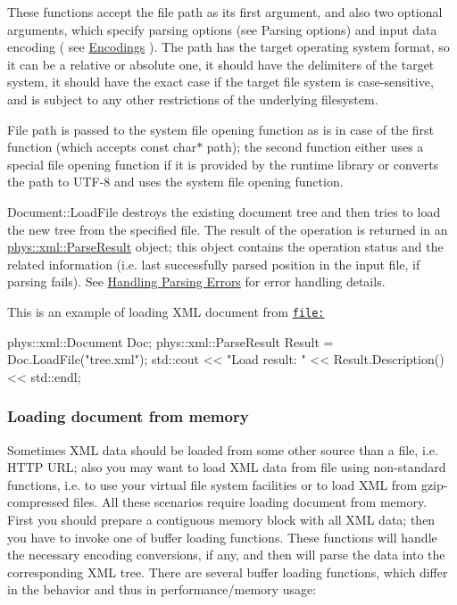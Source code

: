  These functions accept the file path as its first argument, and also two optional arguments, which specify parsing options (see Parsing options) and input data encoding ( see \hyperlink{XMLManual_XMLLoadingEncodings}{Encodings} ). The path has the target operating system format, so it can be a relative or absolute one, it should have the delimiters of the target system, it should have the exact case if the target file system is case-\/sensitive, and is subject to any other restrictions of the underlying filesystem. \par
 \par
 File path is passed to the system file opening function as is in case of the first function (which accepts const char$\ast$ path); the second function either uses a special file opening function if it is provided by the runtime library or converts the path to UTF-\/8 and uses the system file opening function. \par
 \par
 Document::LoadFile destroys the existing document tree and then tries to load the new tree from the specified file. The result of the operation is returned in an \hyperlink{structphys_1_1xml_1_1ParseResult}{phys::xml::ParseResult} object; this object contains the operation status and the related information (i.e. last successfully parsed position in the input file, if parsing fails). See \hyperlink{XMLManual_XMLLoadingErrors}{Handling Parsing Errors} for error handling details. \par
 \par
 This is an example of loading XML document from \href{file:}{\tt file:} 
\begin{DoxyCode}
 phys::xml::Document Doc;
 phys::xml::ParseResult Result = Doc.LoadFile("tree.xml");
 std::cout << "Load result: " << Result.Description() << std::endl;
\end{DoxyCode}
 \hypertarget{XMLManual_XMLLoadingFromMemory}{}\subsubsection{Loading document from memory}\label{XMLManual_XMLLoadingFromMemory}
Sometimes XML data should be loaded from some other source than a file, i.e. HTTP URL; also you may want to load XML data from file using non-\/standard functions, i.e. to use your virtual file system facilities or to load XML from gzip-\/compressed files. All these scenarios require loading document from memory. First you should prepare a contiguous memory block with all XML data; then you have to invoke one of buffer loading functions. These functions will handle the necessary encoding conversions, if any, and then will parse the data into the corresponding XML tree. There are several buffer loading functions, which differ in the behavior and thus in performance/memory usage: 
